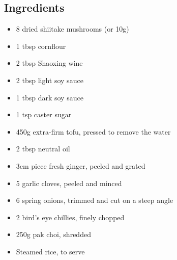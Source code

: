 \documentclass{book}
\begin{document}
\subsection*{Ingredients}
\begin{itemize}
\item 8 dried shiitake mushrooms (or 10g) 
\item 1 tbsp cornflour
\item 2 tbsp Shaoxing wine
\item 2 tbsp light soy sauce
\item 1 tbsp dark soy sauce
\item 1 tsp caster sugar 
\item 450g extra-firm tofu, pressed to remove the water
\item 2 tbsp neutral oil
\item 3cm piece fresh ginger, peeled and grated 
\item 5 garlic cloves, peeled and minced
\item 6 spring onions, trimmed and cut on a steep angle
\item 2 bird’s eye chillies, finely chopped 
\item 250g pak choi, shredded
\item Steamed rice, to serve
\end{itemize}
\end{document}
